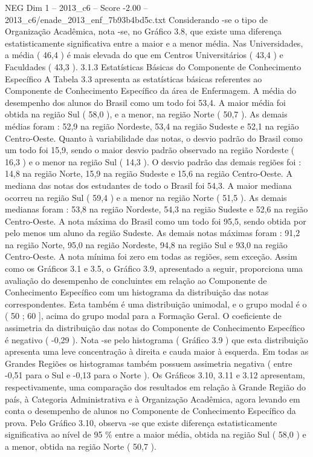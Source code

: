\begin{textsample}{NEG Dim 1 – 2013\_c6 – Score -2.00 – 2013\_c6/enade\_2013\_enf\_7b93b4bd5c.txt}
Considerando -se o tipo de Organização Acadêmica, nota -se, no Gráfico 3.8, que existe uma diferença estatisticamente significativa entre a maior e a menor média.
Nas Universidades, a média ( 46,4 ) é mais elevada do que em Centros Universitários ( 43,4 ) e Faculdades ( 43,3 ). 3.1.3 Estatísticas Básicas do Componente de Conhecimento Específico A Tabela 3.3 apresenta as estatísticas básicas referentes ao Componente de Conhecimento Específico da área de Enfermagem.
A média do desempenho dos alunos do Brasil como um todo foi 53,4.
A maior média foi obtida na região Sul ( 58,0 ), e a menor, na região Norte ( 50,7 ).
As demais médias foram : 52,9 na região Nordeste, 53,4 na região Sudeste e 52,1 na região Centro-Oeste.
Quanto à variabilidade das notas, o desvio padrão do Brasil como um todo foi 15,9, sendo o maior desvio padrão observado na região Nordeste ( 16,3 ) e o menor na região Sul ( 14,3 ).
O desvio padrão das demais regiões foi : 14,8 na região Norte, 15,9 na região Sudeste e 15,6 na região Centro-Oeste.
A mediana das notas dos estudantes de todo o Brasil foi 54,3.
A maior mediana ocorreu na região Sul ( 59,4 ) e a menor na região Norte ( 51,5 ).
As demais medianas foram : 53,8 na região Nordeste, 54,3 na região Sudeste e 52,6 na região Centro-Oeste.
A nota máxima do Brasil como um todo foi 95,5, sendo obtida por pelo menos um aluno da região Sudeste.
As demais notas máximas foram : 91,2 na região Norte, 95,0 na região Nordeste, 94,8 na região Sul e 93,0 na região Centro-Oeste.
A nota mínima foi zero em todas as regiões, sem exceção.
Assim como os Gráficos 3.1 e 3.5, o Gráfico 3.9, apresentado a seguir, proporciona uma avaliação do desempenho de concluintes em relação ao Componente de Conhecimento Específico com um histograma da distribuição das notas correspondentes.
Esta também é uma distribuição unimodal, e o grupo modal é o ( 50 ; 60 ], acima do grupo modal para a Formação Geral.
O coeficiente de assimetria da distribuição das notas do Componente de Conhecimento Específico é negativo ( -0,29 ).
Nota -se pelo histograma ( Gráfico 3.9 ) que esta distribuição apresenta uma leve concentração à direita e cauda maior à esquerda.
Em todas as Grandes Regiões os histogramas também possuem assimetria negativa ( entre -0,51 para o Sul e -0,13 para o Norte ).
Os Gráficos 3.10, 3.11 e 3.12 apresentam, respectivamente, uma comparação dos resultados em relação à Grande Região do país, à Categoria Administrativa e à Organização Acadêmica, agora levando em conta o desempenho de alunos no Componente de Conhecimento Específico da prova.
Pelo Gráfico 3.10, observa -se que existe diferença estatisticamente significativa ao nível de 95 \% entre a maior média, obtida na região Sul ( 58,0 ) e a menor, obtida na região Norte ( 50,7 ).

\end{textsample}

